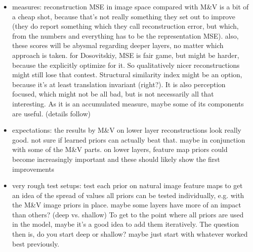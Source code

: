 \documentclass{article}
\begin{document}
\begin{itemize}
	\item measures:
	\subitem reconstruction MSE in image space compared with M\&V is a bit of a cheap shot, because that's not really something they set out to improve (they do report something which they call reconstruction error, but which, from the numbers and everything has to be the representation MSE). also, these scores will be abysmal regarding deeper layers, no matter which approach is taken.
	\subitem for Dosovitskiy, MSE is fair game, but might be harder, because the explicitly optimize for it. So qualitatively nicer reconstructions might still lose that contest.
	\subitem Structural similarity index might be an option, because it's at least translation invariant (right?). It is also perception focused, which might not be all bad, but is not necessarily all that interesting. As it is an accumulated measure, maybe some of its components are useful. (details follow)
	\item expectations:
	\subitem the results by M\&V on lower layer reconstructions look really good. not sure if learned priors can actually beat that. maybe in conjunction with some of the M\&V parts.
	\subitem on lower layers, feature map priors could become increasingly important and these should likely show the first improvements
	\item very rough test setups:
	\subitem test each prior on natural image feature maps to get an idea of the spread of values
	\subitem all priors can be tested individually, e.g. with the M\&V image priors in place. maybe some layers have more of an impact than others? (deep vs. shallow)
	\subitem To get to the point where all priors are used in the model, maybe it's a good idea to add them iteratively. The question then is, do you start deep or shallow? maybe just start with whatever worked best previously. 
	\subitem 
\end{itemize}
\end{document}
